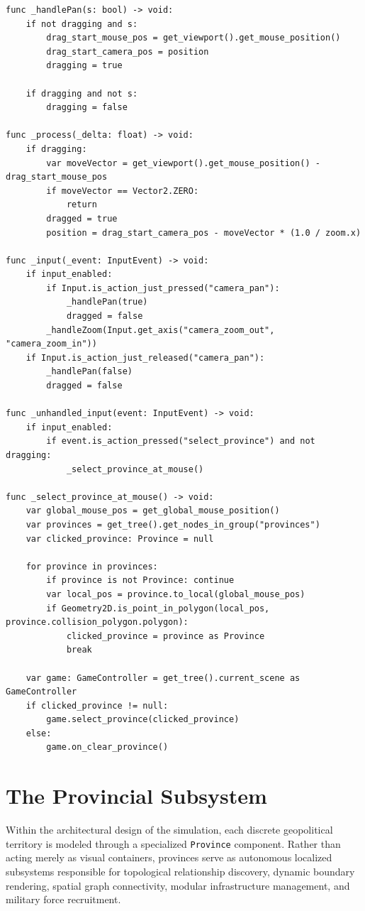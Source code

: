 \begin{lstlisting}
func _handlePan(s: bool) -> void:
    if not dragging and s:
        drag_start_mouse_pos = get_viewport().get_mouse_position()
        drag_start_camera_pos = position
        dragging = true
    
    if dragging and not s:
        dragging = false

func _process(_delta: float) -> void:
    if dragging:
        var moveVector = get_viewport().get_mouse_position() - drag_start_mouse_pos
        if moveVector == Vector2.ZERO: 
            return
        dragged = true
        position = drag_start_camera_pos - moveVector * (1.0 / zoom.x)

func _input(_event: InputEvent) -> void:
    if input_enabled:
        if Input.is_action_just_pressed("camera_pan"):
            _handlePan(true)
            dragged = false
        _handleZoom(Input.get_axis("camera_zoom_out", "camera_zoom_in"))
    if Input.is_action_just_released("camera_pan"):
        _handlePan(false)
        dragged = false

func _unhandled_input(event: InputEvent) -> void:
    if input_enabled:
        if event.is_action_pressed("select_province") and not dragging:
            _select_province_at_mouse()

func _select_province_at_mouse() -> void:
    var global_mouse_pos = get_global_mouse_position()
    var provinces = get_tree().get_nodes_in_group("provinces")
    var clicked_province: Province = null
    
    for province in provinces:
        if province is not Province: continue
        var local_pos = province.to_local(global_mouse_pos)
        if Geometry2D.is_point_in_polygon(local_pos, province.collision_polygon.polygon):
            clicked_province = province as Province
            break
            
    var game: GameController = get_tree().current_scene as GameController
    if clicked_province != null:
        game.select_province(clicked_province)
    else:
        game.on_clear_province()
\end{lstlisting}

\section{The Provincial Subsystem}
\label{sec:provincial_subsystem}

Within the architectural design of the simulation, each discrete geopolitical territory is modeled through a specialized \texttt{Province} component. Rather than acting merely as visual containers, provinces serve as autonomous localized subsystems responsible for topological relationship discovery, dynamic boundary rendering, spatial graph connectivity, modular infrastructure management, and military force recruitment.

